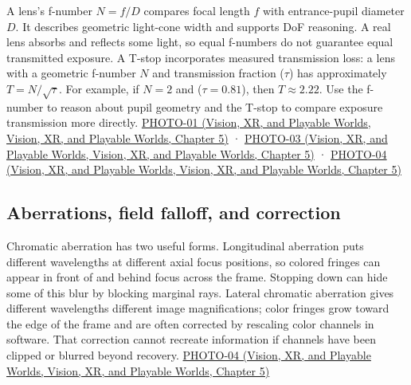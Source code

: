A lens's f-number \(N=f/D\) compares focal length \(f\) with entrance-pupil diameter \(D\). It describes geometric light-cone width and supports DoF reasoning. A real lens absorbs and reflects some light, so equal f-numbers do not guarantee equal transmitted exposure. A T-stop incorporates measured transmission loss: a lens with a geometric f-number \(N\) and transmission fraction (\(\tau\)) has approximately \(T=N/\sqrt{\tau}\). For example, if \(N=2\) and (\(\tau=0.81\)), then \(T\approx2.22\). Use the f-number to reason about pupil geometry and the T-stop to compare exposure transmission more directly. \href{../07-Vision-XR-and-Playable-Worlds/main.pdf\#nameddest=04-visual-computing-ii-ch036-photo-01---photography-session-01}{PHOTO-01 (Vision, XR, and Playable Worlds, Vision, XR, and Playable Worlds, Chapter 5)} · \href{../07-Vision-XR-and-Playable-Worlds/main.pdf\#nameddest=04-visual-computing-ii-ch036-photo-03---photography-session-03}{PHOTO-03 (Vision, XR, and Playable Worlds, Vision, XR, and Playable Worlds, Chapter 5)} · \href{../07-Vision-XR-and-Playable-Worlds/main.pdf\#nameddest=04-visual-computing-ii-ch036-photo-04---photography-session-04}{PHOTO-04 (Vision, XR, and Playable Worlds, Vision, XR, and Playable Worlds, Chapter 5)}

\subsection{Aberrations, field falloff, and correction}\label{03-visual-computing-i-ch003-aberrations-field-falloff-and-correction}

Chromatic aberration has two useful forms. Longitudinal aberration puts different wavelengths at different axial focus positions, so colored fringes can appear in front of and behind focus across the frame. Stopping down can hide some of this blur by blocking marginal rays. Lateral chromatic aberration gives different wavelengths different image magnifications; color fringes grow toward the edge of the frame and are often corrected by rescaling color channels in software. That correction cannot recreate information if channels have been clipped or blurred beyond recovery. \href{../07-Vision-XR-and-Playable-Worlds/main.pdf\#nameddest=04-visual-computing-ii-ch036-photo-04---photography-session-04}{PHOTO-04 (Vision, XR, and Playable Worlds, Vision, XR, and Playable Worlds, Chapter 5)}

